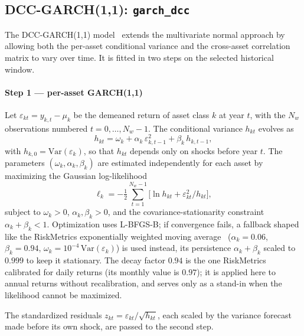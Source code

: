 \documentclass[fleqn,12pt]{report}
\begin{document}
\subsection{DCC-GARCH(1,1): \texttt{garch\_dcc}}

The DCC-GARCH(1,1) model~\cite{engle2002,bollerslev1986} extends the
multivariate normal approach by allowing both the per-asset conditional
variance and the cross-asset correlation matrix to vary over time.
It is fitted in two steps on the selected historical window.

\paragraph*{Step 1 --- per-asset GARCH(1,1)}
Let $\varepsilon_{kt} = y_{k,t} - \mu_k$ be the demeaned return of
asset class $k$ at year $t$, with the $N_w$ observations numbered
$t = 0, \ldots, N_w - 1$.  The conditional variance $h_{kt}$
evolves as
\begin{equation}
    \label{Eq:GARCH11}
    h_{kt} = \omega_k + \alpha_k\,\varepsilon_{k,t-1}^2
              + \beta_k\,h_{k,t-1},
\end{equation}
with $h_{k,0} = \mathrm{Var}(\varepsilon_k)$, so that $h_{kt}$ depends only on shocks
before year $t$.
The parameters $(\omega_k, \alpha_k, \beta_k)$ are estimated
independently for each asset by maximizing the Gaussian
log-likelihood
\begin{equation}
    \ell_k = -\tfrac{1}{2}\sum_{t=1}^{N_w-1}
             \bigl[\ln h_{kt} + \varepsilon_{kt}^2/h_{kt}\bigr],
\end{equation}
subject to $\omega_k > 0$, $\alpha_k, \beta_k > 0$, and the
covariance-stationarity constraint $\alpha_k + \beta_k < 1$.
Optimization uses L-BFGS-B; if convergence fails, a fallback shaped like the
RiskMetrics exponentially weighted moving average~\cite{riskmetrics1996}
($\alpha_k = 0.06$, $\beta_k = 0.94$, $\omega_k = 10^{-4}\,\mathrm{Var}(\varepsilon_k)$)
is used instead, its persistence $\alpha_k + \beta_k$ scaled to $0.999$ to keep it stationary.
The decay factor $0.94$ is the one RiskMetrics calibrated for daily returns
(its monthly value is $0.97$); it is applied here to annual returns without recalibration,
and serves only as a stand-in when the likelihood cannot be maximized.

The standardized residuals $z_{kt} = \varepsilon_{kt}/\sqrt{h_{kt}}$,
each scaled by the variance forecast made before its own shock,
are passed to the second step.
\end{document}
